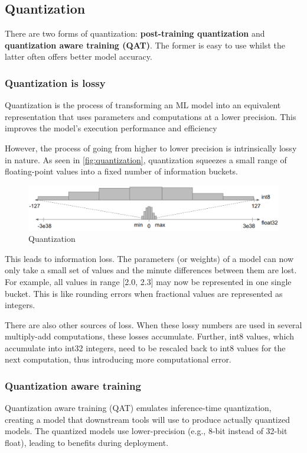\subsection{Quantization}
There are two forms of quantization: \textbf{post-training quantization} and
\textbf{quantization aware training (QAT)}. The former is easy to use whilst
the latter often offers better model accuracy.

\subsubsection{Quantization is lossy}
Quantization is the process of transforming an ML model into an equivalent
representation that uses parameters and computations at a lower precision.
This improves the model's execution performance and efficiency

However, the process of going from higher to lower precision is intrinsically
lossy in nature. As seen in \autoref{fig:quantization}, quantization squeezes
a small range of floating-point values into a fixed number of information
buckets.

\begin{figure}[ht]
    \includegraphics[width=\textwidth]{images/introduction/quantization.png}
    \centering
    \caption{Quantization}\label{fig:quantization}
\end{figure}

This leads to information loss. The parameters (or weights) of a model can now
only take a small set of values and the minute differences between them are
lost. For example, all values in range [2.0, 2.3] may now be represented in one
single bucket. This is like rounding errors when fractional values are
represented as integers.

There are also other sources of loss. When these lossy numbers are used in
several multiply-add computations, these losses accumulate. Further, int8
values, which accumulate into int32 integers, need to be rescaled back to int8
values for the next computation, thus introducing more computational
error.~\cite{tfmot:quantization_blog}

\subsubsection{Quantization aware training}
Quantization aware training (QAT) emulates inference-time quantization,
creating a model that downstream tools will use to produce actually quantized
models. The quantized models use lower-precision (e.g., 8-bit instead of 32-bit
float), leading to benefits during deployment.

